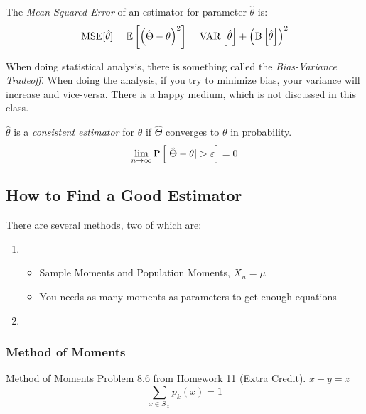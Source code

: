 			\begin{definition} \label{def:Mean Squared Error}
				The \emph{Mean Squared Error} of an estimator for parameter $\hat{\theta}$ is:
				\begin{equation} \label{eq:Mean Squared Error}
					\operatorname{\operatorname{MSE}} [ \hat{\theta} ]
					= \operatorname{\operatorname{\mathbb{E}}} \left[ \left( \hat{\Theta} - \theta \right)^{2} \right]
					= \operatorname{\operatorname{VAR}} \left[ \hat{\theta} \right] + \left( \operatorname{\operatorname{B}} \left[ \hat{\theta} \right] \right)^{2}
				\end{equation}
			\end{definition}
			\begin{remark*}
				When doing statistical analysis, there is something called the \emph{Bias-Variance Tradeoff}.
				When doing the analysis, if you try to minimize bias, your variance will increase and vice-versa.
				There is a happy medium, which is not discussed in this class.
			\end{remark*}
			\begin{definition}[Consistency] \label{def:Consistency}
				$\hat{\theta}$ is a \emph{consistent estimator} for $\theta$ if $\hat{\Theta}$ converges to $\theta$ in probability.
				\begin{equation} \label{eq:Consistency}
					\lim\limits_{n \rightarrow \infty} \operatorname{\operatorname{P}} \left[ \lvert \hat{\Theta} - \theta \rvert > \varepsilon \right] = 0
				\end{equation}
			\end{definition}
	
	\subsection{How to Find a Good Estimator} \label{subsec:Find Good Estimator}
	There are several methods, two of which are:
		\begin{enumerate}
			\item {}
				\begin{itemize}[noitemsep, nolistsep]
					\item Sample Moments and Population Moments, $\bar{X}_{n} = \mu$
					\item You needs as many moments as parameters to get enough equations
				\end{itemize}
			\item {}
		\end{enumerate}
	
		\subsubsection{Method of Moments} \label{subsubsec:Method of Moments}
			\begin{example}{Method of Moments} 
				Problem 8.6 from Homework 11 (Extra Credit).
				$x+y=z$
				\begin{equation*}
					\sum_{x \in S_{X}} p_{k} \left( x \right) = 1
				\end{equation*}
			\end{example}
		
